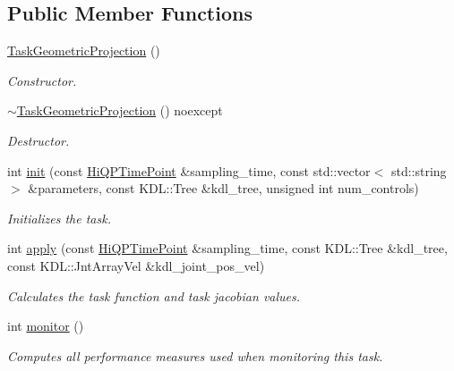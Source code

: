 \subsection*{Public Member Functions}
\begin{DoxyCompactItemize}
\item 
\hypertarget{classhiqp_1_1TaskGeometricProjection_af75d2b163680a57fc5809c9b07e3e678}{\hyperlink{classhiqp_1_1TaskGeometricProjection_af75d2b163680a57fc5809c9b07e3e678}{Task\-Geometric\-Projection} ()}\label{classhiqp_1_1TaskGeometricProjection_af75d2b163680a57fc5809c9b07e3e678}

\begin{DoxyCompactList}\small\item\em Constructor. \end{DoxyCompactList}\item 
\hypertarget{classhiqp_1_1TaskGeometricProjection_a53d6bb2b588b3667961ab97084dcd6ba}{\hyperlink{classhiqp_1_1TaskGeometricProjection_a53d6bb2b588b3667961ab97084dcd6ba}{$\sim$\-Task\-Geometric\-Projection} () noexcept}\label{classhiqp_1_1TaskGeometricProjection_a53d6bb2b588b3667961ab97084dcd6ba}

\begin{DoxyCompactList}\small\item\em Destructor. \end{DoxyCompactList}\item 
int \hyperlink{classhiqp_1_1TaskGeometricProjection_a40985179abed77a08e2ff35ce3bd714d}{init} (const \hyperlink{classhiqp_1_1HiQPTimePoint}{Hi\-Q\-P\-Time\-Point} \&sampling\-\_\-time, const std\-::vector$<$ std\-::string $>$ \&parameters, const K\-D\-L\-::\-Tree \&kdl\-\_\-tree, unsigned int num\-\_\-controls)
\begin{DoxyCompactList}\small\item\em Initializes the task. \end{DoxyCompactList}\item 
int \hyperlink{classhiqp_1_1TaskGeometricProjection_a3eaed2bb6db4b6b6b53503a20d2a1895}{apply} (const \hyperlink{classhiqp_1_1HiQPTimePoint}{Hi\-Q\-P\-Time\-Point} \&sampling\-\_\-time, const K\-D\-L\-::\-Tree \&kdl\-\_\-tree, const K\-D\-L\-::\-Jnt\-Array\-Vel \&kdl\-\_\-joint\-\_\-pos\-\_\-vel)
\begin{DoxyCompactList}\small\item\em Calculates the task function and task jacobian values. \end{DoxyCompactList}\item 
int \hyperlink{classhiqp_1_1TaskGeometricProjection_a6e824a39011d6e5865e13dd956649a71}{monitor} ()
\begin{DoxyCompactList}\small\item\em Computes all performance measures used when monitoring this task. \end{DoxyCompactList}\end{DoxyCompactItemize}
